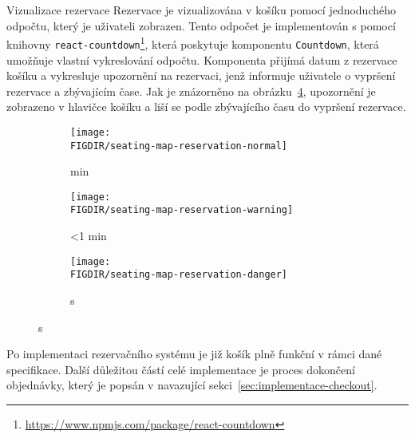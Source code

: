 \begin{subsection}{Vizualizace rezervace}
    \label{subsec:implementace-rezervace-vizualizace}
    Rezervace je vizualizována v košíku pomocí jednoduchého odpočtu, který je uživateli zobrazen.
    Tento odpočet je implementován s pomocí knihovny \texttt{react-countdown}\footnote{\url{https://www.npmjs.com/package/react-countdown}}, která poskytuje komponentu \texttt{Countdown}, která umožňuje vlastní vykreslování odpočtu.
    Komponenta přijímá datum z rezervace košíku a vykresluje upozornění na rezervaci, jenž informuje uživatele o vypršení rezervace a zbývajícím čase.
    Jak je znázorněno na obrázku~\ref{fig:seating-map-reservation}, upozornění je zobrazeno v hlavičce košíku a liší se podle zbývajícího času do vypršení rezervace.

    \begin{figure}[H]
        \centering
        \caption{Upozornění na rezervaci v hlavičce košíku}
        \begin{subfigure}{0.3\textwidth}
            \texttt{[image: \\FIGDIR/seating-map-reservation-normal]}
            \caption{ min}
            \label{fig:seating-map-reservation-normal}
        \end{subfigure}
        \hfill
        \begin{subfigure}{0.3\textwidth}
            \texttt{[image: \\FIGDIR/seating-map-reservation-warning]}
            \caption{\textless 1 min}
            \label{fig:seating-map-reservation-warning}
        \end{subfigure}
        \hfill
        \begin{subfigure}{0.3\textwidth}
            \texttt{[image: \\FIGDIR/seating-map-reservation-danger]}
            \caption{ s}
            \label{fig:seating-map-reservation-danger}
        \end{subfigure}
        \source{}
        \label{fig:seating-map-reservation}
    \end{figure}

    Po implementaci rezervačního systému je již košík plně funkční v rámci dané specifikace.
    Další důležitou částí celé implementace je proces dokončení objednávky, který je popsán v navazující sekci~\ref{sec:implementace-checkout}.
\end{subsection}
